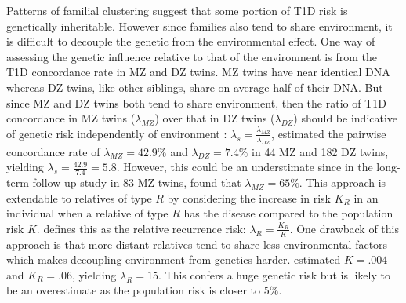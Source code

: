 Patterns of familial clustering suggest that some portion of T1D risk is genetically inheritable.
However since families also tend to share environment, it is difficult to decouple the genetic from the environmental effect.
One way of assessing the genetic influence relative to that of the environment is from the T1D concordance rate in \gls{MZ} and \gls{DZ} twins.
MZ twins have near identical \gls{DNA} whereas DZ twins, like other siblings, share on average half of their DNA.
But since \gls{MZ} and \gls{DZ} twins both tend to share environment, then the ratio of T1D concordance in \gls{MZ} twins ($\lambda_{MZ}$) 
over that in DZ twins ($\lambda_{DZ}$) should be indicative of genetic risk independently of environment \citep{Clayton:2009kf}:
$ \lambda_s = \frac{\lambda_{MZ}}{\lambda_{DZ}}$,
\citet{Hyttinen:2003kn} estimated the pairwise concordance rate of $\lambda_{MZ}=42.9\%$ and $\lambda_{DZ}=7.4\%$ in 44 MZ and 182 DZ twins,
yielding $\lambda_s = \frac{42.9}{7.4} = 5.8$.
However, this could be an understimate since in the long-term follow-up study in 83 MZ twins, \citet{Redondo:2008} found that $\lambda_{MZ}=65\%$.
This approach is extendable to relatives of type $R$ by considering the increase in risk $K_R$ in an individual when a relative of type $R$ has the disease compared to the population risk $K$.
\citet{Risch:1987wm} defines this as the relative recurrence risk: $\lambda_R = \frac{K_R}{K}$.
One drawback of this approach is that more distant relatives tend to share less environmental factors which makes decoupling environment from genetics harder.
\cite{Risch:1987wm} estimated $K=.004$ and $K_R=.06$, yielding $\lambda_R=15$.
This confers a huge genetic risk but is likely to be an overestimate as the population risk is closer to $5\%$.


